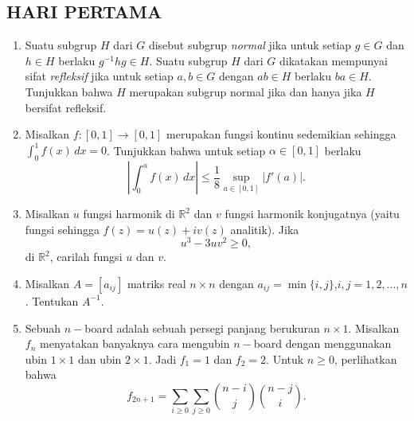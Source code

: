 \documentclass[12pt,twoside]{article}
\begin{document}
\subsection{HARI PERTAMA}
\begin{enumerate}
    \item Suatu subgrup $H$ dari $G$ disebut subgrup \textit{normal} jika untuk setiap $g\in G$ dan $h\in H$ berlaku $g^{-1}hg\in H$. Suatu subgrup $H$  dari $G$ dikatakan mempunyai sifat \textit{refleksif} jika untuk setiap $a,b\in G$ dengan $ab\in H$ berlaku $ba\in H$. Tunjukkan bahwa $H$ merupakan subgrup normal jika dan hanya jika $H$ bersifat refleksif.


    \item Misalkan $f:[0,1]\to[0,1]$ merupakan fungsi kontinu sedemikian sehingga $\displaystyle\int_{0}^{1}f(x)\,dx=0$. Tunjukkan bahwa untuk setiap $\alpha\in[0,1]$ berlaku
          $$\left|\int_{0}^{a}f(x)\,dx\right|\leq \dfrac{1}{8}\sup_{a\in[0,1]}|f'(a)|.$$


    \item Misalkan $u$ fungsi harmonik di $\mathbb{R}^2$ dan $v$ fungsi harmonik konjugatnya (yaitu fungsi sehingga $f(z)=u(z)+iv(z)$ analitik). Jika
          $$u^3-3uv^2\geq 0,$$
          di $\mathbb{R}^2$, carilah fungsi $u$ dan $v$.

    \item Misalkan $A=[a_{ij}]$ matriks real $n\times n$ dengan $a_{ij}=\min\{i,j\}$,$i,j=1,2,\dots,n$. Tentukan $A^{-1}$.

    \item Sebuah $n-$board adalah sebuah persegi panjang berukuran $n\times 1$. Misalkan $f_n$ menyatakan banyaknya cara mengubin $n-$board dengan menggunakan ubin $1\times 1$ dan ubin $2\times 1$. Jadi $f_1=1$ dan $f_2=2$. Untuk $n\geq 0$, perlihatkan bahwa
          $$f_{2n+1}=\sum_{i\geq 0}\sum_{j\geq 0}\binom{n-i}{j}\binom{n-j}{i}.$$
\end{enumerate}
\end{document}
